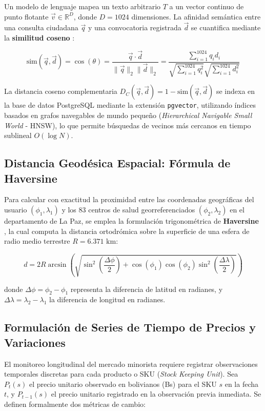 Un modelo de lenguaje mapea un texto arbitrario $T$ a un vector continuo de punto flotante $\vec{v} \in \mathbb{R}^{D}$, donde $D = 1024$ dimensiones. La afinidad semántica entre una consulta ciudadana $\vec{q}$ y una convocatoria registrada $\vec{d}$ se cuantifica mediante la \textbf{similitud coseno} \citep{robusto1957cosine}:

\begin{equation}
    \text{sim}(\vec{q}, \vec{d}) = \cos(\theta) = \frac{\vec{q} \cdot \vec{d}}{\|\vec{q}\|_2 \|\vec{d}\|_2} = \frac{\sum_{i=1}^{1024} q_i d_i}{\sqrt{\sum_{i=1}^{1024} q_i^2} \sqrt{\sum_{i=1}^{1024} d_i^2}}
    \label{eq:cosine_sim}
\end{equation}

La distancia coseno complementaria $D_C(\vec{q}, \vec{d}) = 1 - \text{sim}(\vec{q}, \vec{d})$ se indexa en la base de datos PostgreSQL mediante la extensión \texttt{pgvector}, utilizando índices basados en grafos navegables de mundo pequeño (\textit{Hierarchical Navigable Small World} - HNSW), lo que permite búsquedas de vecinos más cercanos en tiempo sublineal $O(\log N)$.

\subsection{Distancia Geodésica Espacial: Fórmula de Haversine}
Para calcular con exactitud la proximidad entre las coordenadas geográficas del usuario $(\phi_1, \lambda_1)$ y los 83 centros de salud georreferenciados $(\phi_2, \lambda_2)$ en el departamento de La Paz, se emplea la formulación trigonométrica de \textbf{Haversine} \citep{robusto1957cosine}, la cual computa la distancia ortodrómica sobre la superficie de una esfera de radio medio terrestre $R = 6.371\text{ km}$:

\begin{equation}
    d = 2 R \arcsin \left( \sqrt{\sin^2\left(\frac{\Delta \phi}{2}\right) + \cos(\phi_1)\cos(\phi_2)\sin^2\left(\frac{\Delta \lambda}{2}\right)} \right)
    \label{eq:haversine}
\end{equation}

\noindent donde $\Delta \phi = \phi_2 - \phi_1$ representa la diferencia de latitud en radianes, y $\Delta \lambda = \lambda_2 - \lambda_1$ la diferencia de longitud en radianes.

\subsection{Formulación de Series de Tiempo de Precios y Variaciones}
El monitoreo longitudinal del mercado minorista requiere registrar observaciones temporales discretas para cada producto o SKU (\textit{Stock Keeping Unit}). Sea $P_t(s)$ el precio unitario observado en bolivianos (Bs) para el SKU $s$ en la fecha $t$, y $P_{t-1}(s)$ el precio unitario registrado en la observación previa inmediata. Se definen formalmente dos métricas de cambio:

